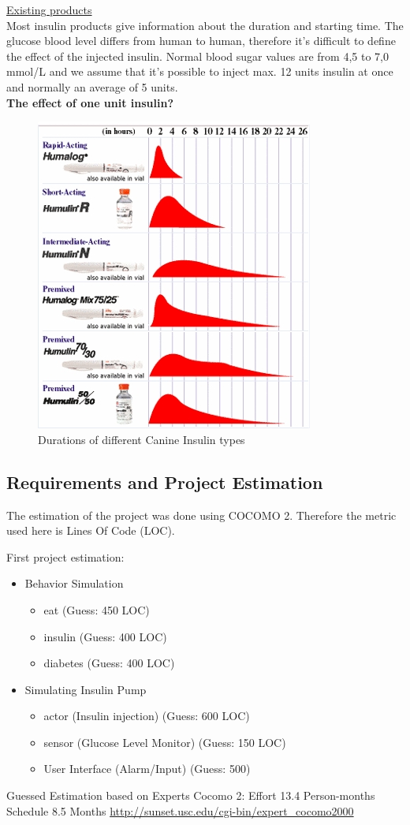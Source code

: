\underline{Existing products}\\
Most insulin products give information about the duration and starting time. The glucose blood level differs from 
human to human, therefore it's difficult to define the effect of the injected insulin. 
Normal blood sugar values are from 4,5 to 7,0 mmol/L and we assume that it's possible to inject max. 12 units insulin 
at once and normally an average of 5 units.\\
\textbf{The effect of one unit insulin?}
\begin{figure}[htb]
\centering
\includegraphics[scale=1]{images/time_activity.jpg}
\caption{Durations of different Canine Insulin types}
\end{figure}

\subsection{Requirements and Project Estimation}
The estimation of the project was done using COCOMO 2.
Therefore the metric used here is Lines Of Code (LOC).

First project estimation:
\begin{itemize}
  \item Behavior Simulation
  	\begin{itemize}
        \item eat (Guess: 450 LOC)
        \item insulin (Guess: 400 LOC)
        \item diabetes (Guess: 400 LOC)
    \end{itemize}
  \item Simulating Insulin Pump
  	\begin{itemize}
        \item actor (Insulin injection) (Guess: 600 LOC)
        \item sensor (Glucose Level Monitor) (Guess: 150 LOC)
        \item User Interface (Alarm/Input) (Guess: 500)
    \end{itemize}
\end{itemize} 
Guessed Estimation based on Experts Cocomo 2:
Effort 13.4 Person-months
Schedule 8.5 Months
\url{http://sunset.usc.edu/cgi-bin/expert_cocomo2000}
